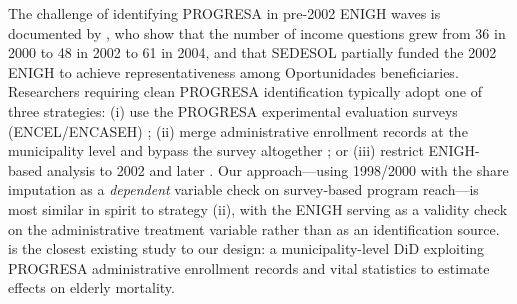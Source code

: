 The challenge of identifying PROGRESA in pre-2002 ENIGH waves is documented
by \citet{hernandez2007}, who show that the number of income questions grew from
36 in 2000 to 48 in 2002 to 61 in 2004, and that SEDESOL partially funded the
2002 ENIGH to achieve representativeness among Oportunidades beneficiaries.
Researchers requiring clean PROGRESA identification typically adopt one of three
strategies: (i) use the PROGRESA experimental evaluation surveys (ENCEL/ENCASEH)
\citep{gertler2004,parker2005,skoufias2001}; (ii) merge administrative enrollment
records at the municipality level and bypass the survey altogether
\citep{barham2013}; or (iii) restrict ENIGH-based analysis to 2002 and later
\citep{parker2008}. Our approach---using 1998/2000 with the share imputation as
a \textit{dependent} variable check on survey-based program reach---is most
similar in spirit to strategy (ii), with the ENIGH serving as a validity check
on the administrative treatment variable rather than as an identification source.
\citet{barham2013} is the closest existing study to our design: a
municipality-level DiD exploiting PROGRESA administrative enrollment records and
vital statistics to estimate effects on elderly mortality.

